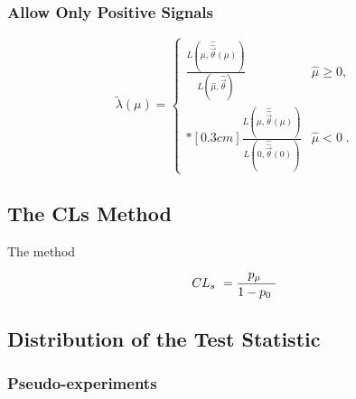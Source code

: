 \subsubsection*{Allow Only Positive Signals}

\begin{equation}
\label{eq:stat:lik:excl}
\tilde{\lambda}({\mu}) =
\left\{ \! \! \begin{array}{ll}
               \frac{ L(\mu,
               \hat{\hat{\vec{\theta}}}(\mu)) }
               {L(\hat{\mu}, \hat{\vec{\theta}}) }
                 & \hat{\mu} \ge 0 , \\*[0.3 cm]
                \frac{ L(\mu,
               \hat{\hat{\vec{\theta}}}(\mu)) }
               {L(0, \hat{\hat{\vec{\theta}}}(0)) }
 & \hat{\mu} < 0 \;.
              \end{array}
       \right.
\end{equation}

\iffalse
\begin{equation}
\label{eq:stat:q:excl}
\qmu = - 2 \ln \tilde{\lambda}(\mu) =
\left\{ \! \! \begin{array}{ll}
               - 2 \ln \frac{L(\mu, \hat{\hat{\vec{\theta}}}(\mu))}
                {L(0, \hat{\hat{\theta}}(0))}
                & \quad \hat{\mu} < 0  \;, \\*[0.2 cm]
               -2 \ln \frac{L(\mu, \hat{\hat{\vec{\theta}}}(\mu))}
                {L(\hat{\mu}, \hat{\vec{\theta}})}
&  \quad \hat{\mu} \ge 0  \;.
              \end{array}
       \right.
\end{equation}
\fi

\subsection{The CLs Method}

The \cls method \cite{JUNK1999435}

\begin{equation}
CL_s \  = \dfrac{p_\mu \ }{1 - p_0 \ }
\end{equation}

\subsection{Distribution of the Test Statistic}

\subsubsection*{Pseudo-experiments}

